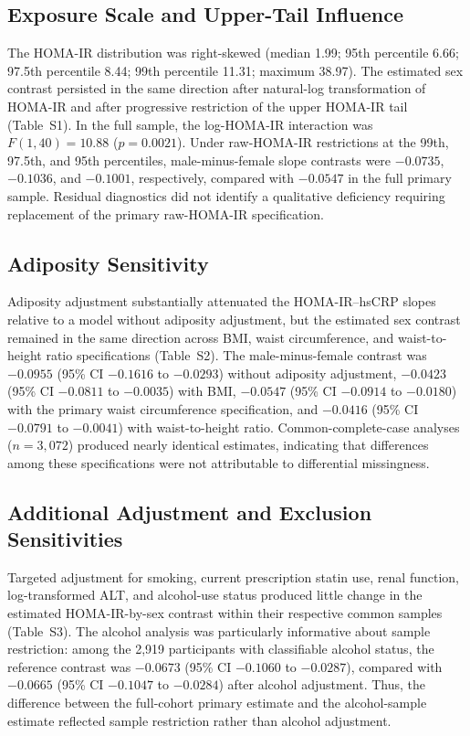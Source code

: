 \documentclass[11pt]{article}
\begin{document}
\subsection{Exposure Scale and Upper-Tail Influence}

The HOMA-IR distribution was right-skewed (median 1.99; 95th percentile 6.66;
97.5th percentile 8.44; 99th percentile 11.31; maximum 38.97). The estimated
sex contrast persisted in the same direction after natural-log transformation
of HOMA-IR and after progressive restriction of the upper HOMA-IR tail
(Table~S1). In the full sample, the log-HOMA-IR interaction was
$F(1,40)=10.88$ ($p=0.0021$). Under raw-HOMA-IR restrictions at the 99th,
97.5th, and 95th percentiles, male-minus-female slope contrasts were
$-0.0735$, $-0.1036$, and $-0.1001$, respectively, compared with $-0.0547$
in the full primary sample. Residual diagnostics did not identify a
qualitative deficiency requiring replacement of the primary raw-HOMA-IR
specification.

\subsection{Adiposity Sensitivity}

Adiposity adjustment substantially attenuated the HOMA-IR--hsCRP slopes
relative to a model without adiposity adjustment, but the estimated sex
contrast remained in the same direction across BMI, waist circumference, and
waist-to-height ratio specifications (Table~S2). The male-minus-female
contrast was $-0.0955$ (95\% CI $-0.1616$ to $-0.0293$) without adiposity
adjustment, $-0.0423$ (95\% CI $-0.0811$ to $-0.0035$) with BMI,
$-0.0547$ (95\% CI $-0.0914$ to $-0.0180$) with the primary waist
circumference specification, and $-0.0416$ (95\% CI $-0.0791$ to
$-0.0041$) with waist-to-height ratio. Common-complete-case analyses
($n=3,072$) produced nearly identical estimates, indicating that differences
among these specifications were not attributable to differential missingness.

\subsection{Additional Adjustment and Exclusion Sensitivities}

Targeted adjustment for smoking, current prescription statin use, renal
function, log-transformed ALT, and alcohol-use status produced little change
in the estimated HOMA-IR-by-sex contrast within their respective common
samples (Table~S3). The alcohol analysis was particularly informative about
sample restriction: among the 2,919 participants with classifiable alcohol
status, the reference contrast was $-0.0673$ (95\% CI $-0.1060$ to
$-0.0287$), compared with $-0.0665$ (95\% CI $-0.1047$ to $-0.0284$)
after alcohol adjustment. Thus, the difference between the full-cohort
primary estimate and the alcohol-sample estimate reflected sample restriction
rather than alcohol adjustment.
\end{document}
